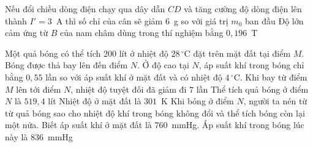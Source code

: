 \begin{ex}
		{\True Nếu đổi chiều dòng điện chạy qua dây dẫn $CD$ và tăng cường độ dòng điện lên thành $I'=3$~A thì số chỉ của cân sẽ giảm $6$~g so với giá trị $m_0$ ban đầu}
		{\True Độ lớn cảm ứng từ $B$ của nam châm dùng trong thí nghiệm bằng $0{,}196$~T}
	\end{ex}

	\begin{ex}%
		Một quả bóng có thể tích $200$ lít ở nhiệt độ $28\,^\circ\text{C}$ đặt trên mặt đất tại điểm $M$. Bóng được thả bay lên đến điểm $N$. Ở độ cao tại $N$, áp suất khí trong bóng chỉ bằng $0{,}55$ lần so với áp suất khí ở mặt đất và có nhiệt độ $4\,^\circ\text{C}$.
		\choiceTFt
		{Khi bay từ điểm $M$ lên tới điểm $N$, nhiệt độ tuyệt đối đã giảm đi $7$ lần}
		{Thể tích quả bóng ở điểm $N$ là $519{,}4$ lít}
		{\True Nhiệt độ ở mặt đất là $301$~K}
		{\True Khi bóng ở điểm $N$, người ta nén từ từ quả bóng sao cho nhiệt độ khí trong bóng không đổi và thể tích bóng còn lại một nửa. Biết áp suất khí ở mặt đất là $760$~mmHg. Áp suất khí trong bóng lúc này là $836$~mmHg}
	\end{ex}

